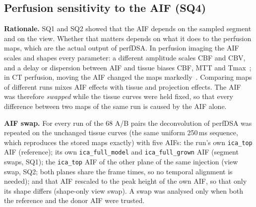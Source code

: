 %
%

\subsection{Perfusion sensitivity to the AIF (SQ4)}
\label{sec:sq4_methods}

\textbf{Rationale.} SQ1 and SQ2 showed that the AIF depends on the sampled segment and on the view. Whether that
matters depends on what it does to the perfusion maps, which are the actual output of perfDSA. In perfusion
imaging the AIF scales and shapes every parameter: a different amplitude scales CBF and CBV, and a delay or
dispersion between AIF and tissue biases CBF, MTT and Tmax~\cite{calamante2000,calamante2013}; in CT perfusion,
moving the AIF changed the maps markedly~\cite{ferreira2010}. Comparing maps of different runs mixes AIF effects with
tissue and projection effects. The AIF was therefore \emph{swapped} while the tissue curves were held fixed, so that
every difference between two maps of the same run is caused by the AIF alone.

\textbf{AIF swap.} For every run of the 68 A/B pairs the deconvolution of perfDSA was repeated on the unchanged
tissue curves (the same uniform 250\,ms sequence, which reproduces the stored maps exactly) with five AIFs: the run's
own \texttt{ica\_top} AIF (reference); its own \texttt{ica\_full\_model} and \texttt{ica\_full\_grown} AIF (segment
swaps, SQ1); the \texttt{ica\_top} AIF of the other plane of the same injection (view swap, SQ2; both planes share the
frame times, so no temporal alignment is needed); and that AIF rescaled to the peak height of the own AIF, so that only
its shape differs (shape-only view swap). A swap was analysed only when both the reference and the donor AIF were
trusted.

